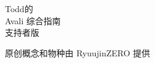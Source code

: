 \thispagestyle{empty}

\vspace*{\fill}
\begin{center}
	{\Huge Todd的}\\[1cm]
	{\fontsize{40}{48}\selectfont Avali 综合指南}\\[1.5cm]
	{\fontsize{28}{34}\selectfont 支持者版}
\end{center}
\vspace*{\fill}

\begin{center}
	{\Large 原创概念和物种由 RyuujinZERO 提供}
\end{center}

\clearpage
